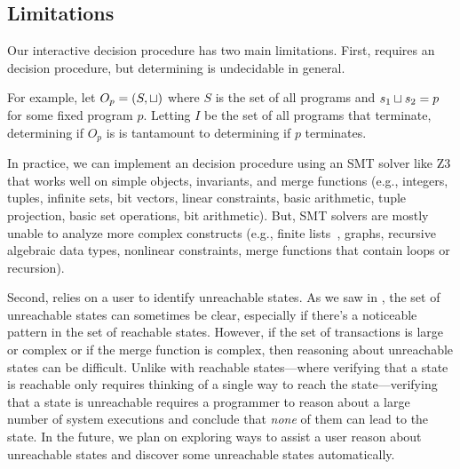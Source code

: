 \subsection{Limitations}
Our interactive \invariantconfluence{} decision procedure has two main
limitations. First,  requires an
\invariantclosure{} decision procedure, but determining \invariantclosure{} is
undecidable in general.
%
\begin{techreport}

  For example, let $O_p = (S, \sqcup)$ where $S$ is the set of all programs and
  $s_1 \sqcup s_2 = p$ for some fixed program $p$. Letting $I$ be the set of all
  programs that terminate, determining if $O_p$ is \Iclosed{} is tantamount to
  determining if $p$ terminates.
\end{techreport}
%
In practice, we can implement an \invariantclosure{} decision procedure using
an SMT solver like Z3 that works well on simple objects, invariants, and merge
functions (e.g., integers, tuples, infinite sets, bit vectors, linear
constraints, basic arithmetic, tuple projection, basic set operations, bit
arithmetic). But, SMT solvers are mostly unable to analyze more complex
constructs (e.g., finite lists~\cite{kroning2009proposal}, graphs, recursive
algebraic data types, nonlinear constraints, merge functions that contain loops
or recursion).

Second,  relies on a user to identify
unreachable states. As we saw in , the set of
unreachable states can sometimes be clear, especially if there's a noticeable
pattern in the set of reachable states. However, if the set of transactions is
large or complex or if the merge function is complex, then reasoning about
unreachable states can be difficult.  Unlike with reachable states---where
verifying that a state is reachable only requires thinking of a single way to
reach the state---verifying that a state is unreachable requires a programmer
to reason about a large number of system executions and conclude that
\emph{none} of them can lead to the state. In the future, we plan on exploring
ways to assist a user reason about unreachable states and discover some
unreachable states automatically.

